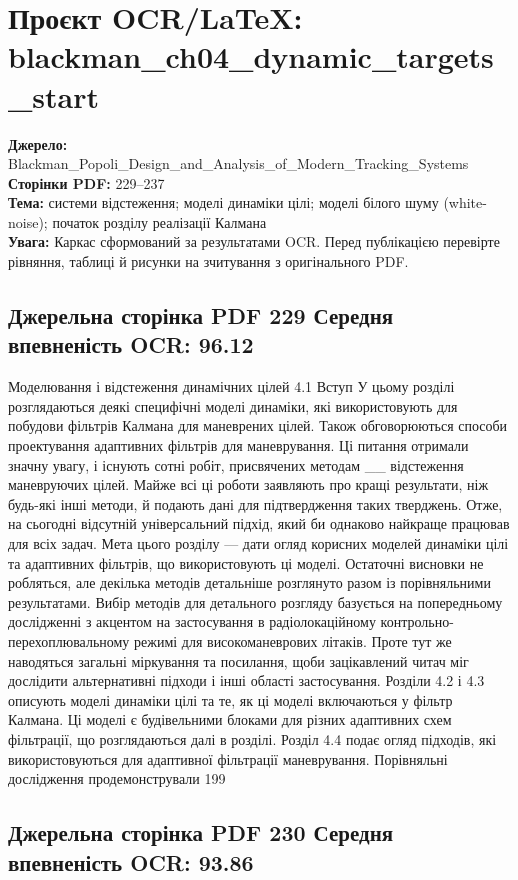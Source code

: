 \documentclass[11pt]{article}
\begin{document}
\section*{Проєкт OCR/LaTeX: blackman\_ch04\_dynamic\_targets\_start}
\textbf{Джерело:} Blackman\_Popoli\_Design\_and\_Analysis\_of\_Modern\_Tracking\_Systems\\
\textbf{Сторінки PDF:} 229--237\\
\textbf{Тема:} системи відстеження; моделі динаміки цілі; моделі білого шуму (white-noise); початок розділу реалізації Калмана\\
\textbf{Увага:} Каркас сформований за результатами OCR. Перед публікацією перевірте рівняння, таблиці й рисунки на зчитування з оригінального PDF.\\
\clearpage\subsection*{Джерельна сторінка PDF 229 \quad Середня впевненість OCR: 96.12}
Моделювання і відстеження
динамічних цілей
4.1 Вступ
У цьому розділі розглядаються деякі специфічні моделі динаміки, які
використовують для побудови фільтрів Калмана для маневрених цілей. Також
обговорюються способи проектування адаптивних фільтрів для маневрування.
Ці питання отримали
значну увагу, і існують сотні робіт, присвячених методам \_\_ відстеження маневруючих цілей.
Майже всі ці роботи заявляють про кращі результати, ніж будь-які інші методи,
й подають дані для підтвердження таких тверджень. Отже, на сьогодні
відсутній універсальний підхід, який би однаково найкраще працював для всіх задач.
Мета цього розділу — дати огляд корисних моделей динаміки цілі
та адаптивних фільтрів, що використовують ці моделі. Остаточні висновки
не робляться, але декілька методів детальніше розглянуто разом із порівняльними
результатами. Вибір методів для детального розгляду базується на попередньому
дослідженні з акцентом на застосування в радіолокаційному контрольно-перехоплювальному
режимі для високоманеврових літаків. Проте тут же наводяться загальні міркування
та посилання, щоби зацікавлений читач міг дослідити альтернативні підходи
і інші області застосування.
Розділи 4.2 і 4.3 описують моделі динаміки цілі та те,
як ці моделі включаються у фільтр Калмана. Ці моделі є будівельними блоками
для різних адаптивних схем фільтрації, що розглядаються далі в розділі.
Розділ 4.4 подає огляд підходів, які використовуються для адаптивної
фільтрації маневрування. Порівняльні дослідження продемонстрували
199
\clearpage\subsection*{Джерельна сторінка PDF 230 \quad Середня впевненість OCR: 93.86}
\end{document}
